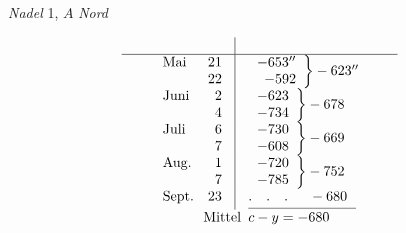 \begin{center}\textit{Nadel} 1, $A$ \textit{Nord}\end{center}
\[
\begin{array}{@{\hspace{.085\linewidth}}lr@{\hspace{.027\linewidth}}|@{\hspace{.027\linewidth}}l@{\hspace{.08\linewidth}}}
&&\\\hline
\begin{array}{@{}l@{}}\text{Mai}\\{}\end{array}&\begin{array}{@{}r@{}}21\\22\end{array}&\left.\begin{array}{r}-653''\\-592\end{array}\right\}-623''\\
\begin{array}{@{}l@{}}\text{Juni}\\{}\end{array}&\begin{array}{@{}r@{}}2\\4\end{array}&\left.\begin{array}{r}-623\\-734\end{array}\right\}-678\\
\begin{array}{@{}l@{}}\text{Juli}\\{}\end{array}&\begin{array}{@{}r@{}}6\\7\end{array}&\left.\begin{array}{r}-730\\-608\end{array}\right\}-669\\
\begin{array}{@{}l@{}}\text{Aug.}\\{}\end{array}&\begin{array}{@{}r@{}}1\\7\end{array}&\left.\begin{array}{r}-720\\-785\end{array}\right\}-752\\
\text{Sept.}&23&.\quad.\quad.\hspace{1.5em}-680\\[3pt]
\multicolumn{2}{r@{\hspace{.015\linewidth}}}{\text{Mittel}}&\rlap{\raisebox{2.15ex}[0pt][0pt]{\rule{.223\linewidth}{.35pt}}}c-y=-680
\end{array}
\]
